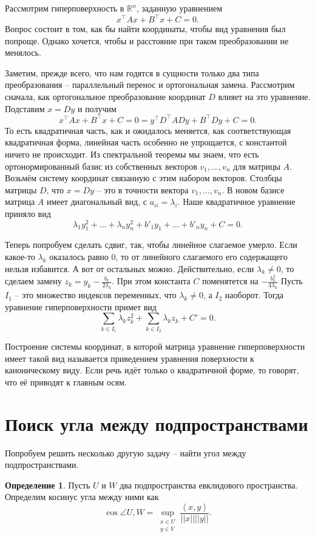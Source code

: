 \documentclass[10pt,a4paper,oneside]{book}
\theoremstyle{definition}
\newtheorem{defn}{Определение}
\newcommand{\mb}[1]{\mathbb{#1}}
\def\lan{\left\langle }
\def\ran{\right\rangle}
\def\dfn{\begin{defn}}
\def\edfn{\end{defn}}
\begin{document}
Рассмотрим гиперповерхность в $\mb R^n$, заданную уравнением  
$$x^{\top} Ax+B^{\top}x +C=0.$$
Вопрос состоит в том, как бы найти координаты, чтобы вид уравнения был попроще. Однако хочется, чтобы и расстояние при таком преобразовании не менялось.

Заметим, прежде всего, что нам годятся в сущности только два типа преобразования -- параллельный перенос и ортогональная замена. Рассмотрим сначала, как ортогональное преобразование координат $D$ влияет на это уравнение. Подставим $x=Dy$ и получим 
$$ x^{\top} Ax+B^{\top}x +C=0= y^{\top} D^{\top}ADy +B^{\top}Dy +C=0.$$
То есть квадратичная часть, как и ожидалось меняется, как соответствующая квадратичная форма, линейная часть особенно не упрощается, с константой ничего не происходит. Из спектральной теоремы мы знаем, что есть ортонормированный базис из собственных векторов $v_1,\dots, v_n $ для матрицы $A$. Возьмём систему координат связанную с этим набором векторов. Столбцы матрицы  $D$, что $x=Dy$  -- это в точности  вектора $v_1,\dots,v_n$. В новом базисе матрица $A$ имеет диагональный вид, с $a_{ii}=\lambda_i$. Наше квадратичное уравнение приняло вид 
$$\lambda_1y_1^2+\dots+ \lambda_n y_n^2 + b'_1y_1+\dots +b'_ny_n +C =0.$$

Теперь попробуем сделать сдвиг, так, чтобы линейное слагаемое умерло. Если какое-то $\lambda_k$ оказалось равно 0, то от линейного слагаемого его содержащего нельзя избавится. А вот от остальных можно. Действительно, если $\lambda_k\neq 0$, то сделаем замену  $z_k=y_k-\frac{b_k}{2\lambda_k}$. При этом константа $C$ поменятется на $-\frac{b^2_k}{4\lambda_k}$ Пусть  $I_1$ -- это множество индексов переменных, что $\lambda_k \neq 0$, а $I_2$ наоборот. Тогда уравнение гиперповерхности примет вид 
$$\sum_{k\in I_1} \lambda_kz_k^2+ \sum_{k\in I_2}\lambda_k z_k + C'=0.$$


Построение системы координат, в которой матрица уравнение гиперповерхности имеет такой вид называется приведением уравнения поверхности к каноническому виду. Если речь идёт только о квадратичной форме, то говорят, что её приводят к главным осям.


\section*{Поиск угла между подпространствами}
Попробуем решить несколько другую задачу -- найти угол между подпространствами. 

\dfn
Пусть $U$ и $W$ два подпространства  евклидового пространства. Определим косинус угла между ними как 
$$\cos \angle U,W= \sup_{\substack{ x\in U\\ y\in V}} \frac{\lan x,y\ran}{||x|| ||y||}.$$
\edfn
\end{document}
